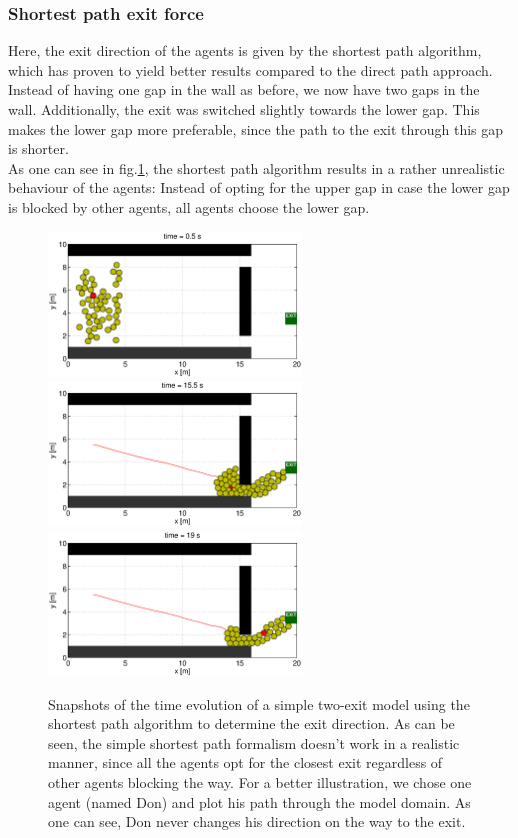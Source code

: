 \documentclass[11pt]{article}
\begin{document}
\subsubsection{Shortest path exit force}\label{sec:two_exits1}
Here, the exit direction of the agents is given by the shortest path algorithm, which has proven to yield better results compared to the direct path approach. Instead of having one gap in the wall as before, we now have two gaps in the wall. Additionally, the exit was switched slightly towards the lower gap. This makes the lower gap more preferable, since the path to the exit through this gap is shorter.\\
As one can see in fig.\ref{fig:two_exits1}, the shortest path algorithm results in a rather unrealistic behaviour of the agents: Instead of opting for the upper gap in case the lower gap is blocked by other agents, all agents choose the lower gap.
\begin{figure}
	\centering
	\includegraphics[width=0.6\textwidth]{figures/TwoExitsShortestPath_000050.eps}
	\qquad
	\includegraphics[width=0.6\textwidth]{figures/TwoExitsShortestPath_001550.eps}
	\qquad
	\includegraphics[width=0.6\textwidth]{figures/TwoExitsShortestPath_001900.eps}
	\caption{Snapshots of the time evolution of a simple two-exit model using the shortest path algorithm to determine the exit direction. As can be seen, the simple shortest path formalism doesn't work in a realistic manner, since all the agents opt for the closest exit regardless of other agents blocking the way. For a better illustration, we chose one agent (named Don) and plot his path through the model domain. As one can see, Don never changes his direction on the way to the exit.}
	\label{fig:two_exits1}
\end{figure}
\end{document}
